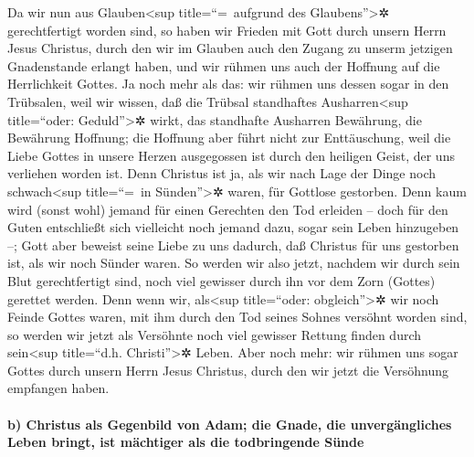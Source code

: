  Da wir nun aus Glauben\textless sup title=``=~aufgrund
des Glaubens''\textgreater✲ gerechtfertigt worden sind, so haben wir
Frieden mit Gott durch unsern Herrn Jesus Christus,  durch
den wir im Glauben auch den Zugang zu unserm jetzigen Gnadenstande
erlangt haben, und wir rühmen uns auch der Hoffnung auf die Herrlichkeit
Gottes.  Ja noch mehr als das: wir rühmen uns dessen sogar
in den Trübsalen, weil wir wissen, daß die Trübsal standhaftes
Ausharren\textless sup title=``oder: Geduld''\textgreater✲ wirkt,
 das standhafte Ausharren Bewährung, die Bewährung
Hoffnung;  die Hoffnung aber führt nicht zur Enttäuschung,
weil die Liebe Gottes in unsere Herzen ausgegossen ist durch den
heiligen Geist, der uns verliehen worden ist.  Denn
Christus ist ja, als wir nach Lage der Dinge noch schwach\textless sup
title=``=~in Sünden''\textgreater✲ waren, für Gottlose gestorben.
 Denn kaum wird (sonst wohl) jemand für einen Gerechten
den Tod erleiden -- doch für den Guten entschließt sich vielleicht noch
jemand dazu, sogar sein Leben hinzugeben --;  Gott aber
beweist seine Liebe zu uns dadurch, daß Christus für uns gestorben ist,
als wir noch Sünder waren.  So werden wir also jetzt,
nachdem wir durch sein Blut gerechtfertigt sind, noch viel gewisser
durch ihn vor dem Zorn (Gottes) gerettet werden.  Denn
wenn wir, als\textless sup title=``oder: obgleich''\textgreater✲ wir
noch Feinde Gottes waren, mit ihm durch den Tod seines Sohnes versöhnt
worden sind, so werden wir jetzt als Versöhnte noch viel gewisser
Rettung finden durch sein\textless sup title=``d.h.
Christi''\textgreater✲ Leben.  Aber noch mehr: wir rühmen
uns sogar Gottes durch unsern Herrn Jesus Christus, durch den wir jetzt
die Versöhnung empfangen haben.

\hypertarget{b-christus-als-gegenbild-von-adam-die-gnade-die-unverguxe4ngliches-leben-bringt-ist-muxe4chtiger-als-die-todbringende-suxfcnde}{%
\paragraph{b) Christus als Gegenbild von Adam; die Gnade, die
unvergängliches Leben bringt, ist mächtiger als die todbringende
Sünde}\label{b-christus-als-gegenbild-von-adam-die-gnade-die-unverguxe4ngliches-leben-bringt-ist-muxe4chtiger-als-die-todbringende-suxfcnde}}

